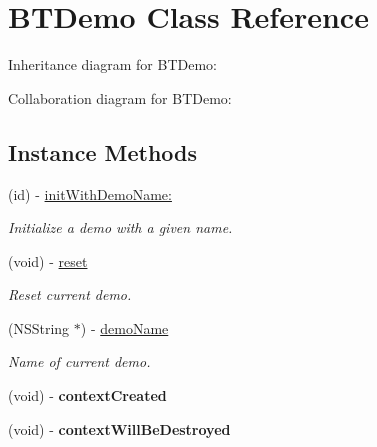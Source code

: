 \hypertarget{interface_b_t_demo}{\section{B\+T\+Demo Class Reference}
\label{interface_b_t_demo}
}


Inheritance diagram for B\+T\+Demo\+:


Collaboration diagram for B\+T\+Demo\+:
\subsection*{Instance Methods}
\begin{DoxyCompactItemize}
\item 
\hypertarget{interface_b_t_demo_af2fb39705584bc5c886e83263f1f6d72}{(id) -\/ \hyperlink{interface_b_t_demo_af2fb39705584bc5c886e83263f1f6d72}{init\+With\+Demo\+Name\+:}}\label{interface_b_t_demo_af2fb39705584bc5c886e83263f1f6d72}

\begin{DoxyCompactList}\small\item\em Initialize a demo with a given name. \end{DoxyCompactList}\item 
\hypertarget{interface_b_t_demo_a2f20ac29f8f66908e5bea855dc22aa96}{(void) -\/ \hyperlink{interface_b_t_demo_a2f20ac29f8f66908e5bea855dc22aa96}{reset}}\label{interface_b_t_demo_a2f20ac29f8f66908e5bea855dc22aa96}

\begin{DoxyCompactList}\small\item\em Reset current demo. \end{DoxyCompactList}\item 
\hypertarget{interface_b_t_demo_aba7c8e1ff06c7e117de21dc9de3d85a0}{(N\+S\+String $\ast$) -\/ \hyperlink{interface_b_t_demo_aba7c8e1ff06c7e117de21dc9de3d85a0}{demo\+Name}}\label{interface_b_t_demo_aba7c8e1ff06c7e117de21dc9de3d85a0}

\begin{DoxyCompactList}\small\item\em Name of current demo. \end{DoxyCompactList}\item 
\hypertarget{interface_b_t_demo_a01ed3963f92b614ce3eab7a6703d42e8}{(void) -\/ {\bfseries context\+Created}}\label{interface_b_t_demo_a01ed3963f92b614ce3eab7a6703d42e8}

\item 
\hypertarget{interface_b_t_demo_adc54592db7c6c8207941f71e37ee045f}{(void) -\/ {\bfseries context\+Will\+Be\+Destroyed}}\label{interface_b_t_demo_adc54592db7c6c8207941f71e37ee045f}


\end{DoxyCompactItemize}
